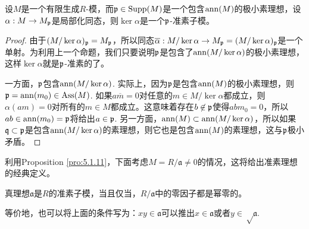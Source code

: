 \begin{pro}\label{pro:5.2.13}
	设$M$是一个有限生成$R$-模，而$\mathfrak{p}\in \operatorname{Supp}(M)$是一个包含$\operatorname{ann}(M)$的极小素理想，设$\alpha:M\to M_{\mathfrak{p}}$是局部化同态，则$\ker\alpha$是一个$\mathfrak{p}$-准素子模。
\end{pro}

\begin{proof}
	由于$(M/\ker\alpha)_{\mathfrak{p}}=M_{\mathfrak{p}}$，所以同态$\overline{\alpha}:M/\ker\alpha\to M_{\mathfrak{p}}=(M/\ker\alpha)_{\mathfrak{p}}$是一个单射。为利用上一个命题，我们只要说明$\mathfrak{p}$是包含了$\operatorname{ann}(M/\ker \alpha)$的极小素理想，这样$\ker \alpha$就是$\mathfrak{p}$-准素的了。

	一方面，$\mathfrak{p}$包含$\operatorname{ann}(M/\ker \alpha)$. 实际上，因为$\mathfrak{p}$是包含$\operatorname{ann}(M)$的极小素理想，则$\mathfrak{p}=\operatorname{ann}(m_0)\in \operatorname{Ass}(M)$. 如果$a\overline{m}=0$对任意的$m\in M/\ker \alpha$都成立，则$\alpha(am)=0$对所有的$m\in M$都成立。这意味着存在$b\not\in \mathfrak{p}$使得$abm_0=0$，所以$ab\in \operatorname{ann}(m_0)=\mathfrak{p}$将给出$a\in \mathfrak{p}$. 另一方面，$\operatorname{ann}(M)\subset \operatorname{ann}(M/\ker \alpha)$，所以如果$\mathfrak q\subset \mathfrak{p}$是包含$\operatorname{ann}(M/\ker \alpha)$的素理想，则它也是包含$\operatorname{ann}(M)$的素理想，这与$\mathfrak{p}$极小矛盾。
\end{proof}




利用Proposition \ref{pro:5.1.11}，下面考虑$M=R/\mathfrak{a}\neq 0$的情况，这将给出准素理想的经典定义。

\begin{pro}
真理想$\mathfrak{a}$是$R$的准素子模，当且仅当，$R/\mathfrak{a}$中的零因子都是幂零的。
\end{pro}

等价地，也可以将上面的条件写为：$xy\in \mathfrak{a}$可以推出$x\in \mathfrak{a}$或者$y\in \sqrt\mathfrak{a}$.

